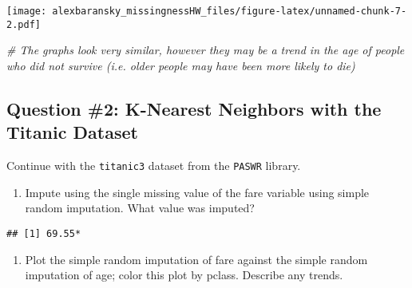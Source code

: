 \documentclass[]{article}
\newenvironment{Shaded}{\begin{snugshade}}{\end{snugshade}}
\newcommand{\KeywordTok}[1]{\textcolor[rgb]{0.13,0.29,0.53}{\textbf{#1}}}
\newcommand{\DecValTok}[1]{\textcolor[rgb]{0.00,0.00,0.81}{#1}}
\newcommand{\StringTok}[1]{\textcolor[rgb]{0.31,0.60,0.02}{#1}}
\newcommand{\CommentTok}[1]{\textcolor[rgb]{0.56,0.35,0.01}{\textit{#1}}}
\newcommand{\OperatorTok}[1]{\textcolor[rgb]{0.81,0.36,0.00}{\textbf{#1}}}
\newcommand{\NormalTok}[1]{#1}
\providecommand{\tightlist}{%
  \setlength{\itemsep}{0pt}\setlength{\parskip}{0pt}}
\begin{document}
\texttt{[image: alexbaransky\_missingnessHW\_files/figure-latex/unnamed-chunk-7-2.pdf]}

\begin{Shaded}
\begin{Highlighting}[]
\CommentTok{# The graphs look very similar, however they may be a trend in the age of people who did not survive (i.e. older people may have been more likely to die)}
\end{Highlighting}
\end{Shaded}

\subsection{Question \#2: K-Nearest Neighbors with the Titanic
Dataset}\label{question-2-k-nearest-neighbors-with-the-titanic-dataset}

Continue with the \texttt{titanic3} dataset from the \texttt{PASWR}
library.

\begin{enumerate}
\def\labelenumi{\arabic{enumi}.}
\tightlist
\item
  Impute using the single missing value of the fare variable using
  simple random imputation. What value was imputed?
\end{enumerate}

\begin{Shaded}
\end{Shaded}

\begin{verbatim}
## [1] 69.55*
\end{verbatim}

\begin{enumerate}
\def\labelenumi{\arabic{enumi}.}
\setcounter{enumi}{1}
\tightlist
\item
  Plot the simple random imputation of fare against the simple random
  imputation of age; color this plot by pclass. Describe any trends.
\end{enumerate}
\end{document}
